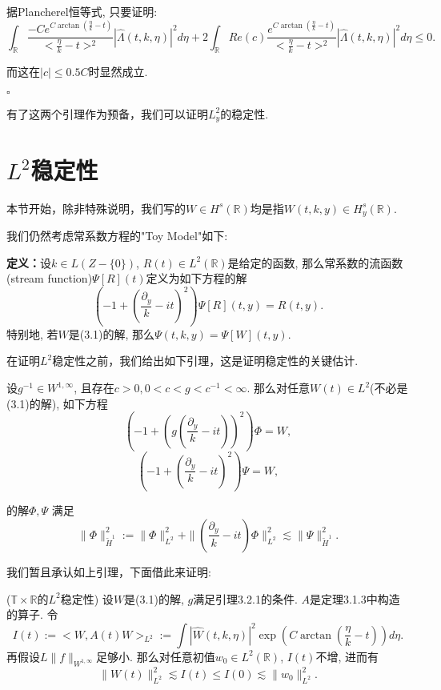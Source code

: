 据Plancherel恒等式, 只要证明:
\begin{equation}
\int_{\mathbb{R}}\frac{-Ce^{C\arctan(\frac{\eta}{k}-t)}}{<\frac{\eta}{k}-t>^2}|\hat{\Lambda}(t,k,\eta)|^2d\eta+2\int_{\mathbb{R}}Re(c)\frac{e^{C\arctan(\frac{\eta}{k}-t)}}{<\frac{\eta}{k}-t>^2}|\hat{\Lambda}(t,k,\eta)|^2d\eta\leq 0.
\end{equation}

而这在$|c|\leq 0.5C$时显然成立.
\begin{flushright}
$\square$
\end{flushright}

有了这两个引理作为预备，我们可以证明$L_y^2$的稳定性.

\section{$L^2$稳定性}

本节开始，除非特殊说明，我们写的$W\in H^s(\mathbb{R})$均是指$W(t,k,y)\in H_y^s(\mathbb{R})$. 

我们仍然考虑常系数方程的"Toy Model"如下:

\textbf{定义：}设$k\in L(Z-\{0\})$, $R(t)\in L^2(\mathbb{R})$是给定的函数, 那么常系数的流函数(stream function)$\Psi[R](t)$定义为如下方程的解
\begin{equation}
(-1+(\frac{\partial_y}{k}-it)^2)\Psi[R](t,y)=R(t,y).
\end{equation}
特别地, 若$W$是(3.1)的解, 那么$\Psi(t,k,y)=\Psi[W](t,y)$.

在证明$L^2$稳定性之前，我们给出如下引理，这是证明稳定性的关键估计.


\begin{lem} 
\songti\rm 设$g^{-1}\in W^{1,\infty}$, 且存在$c>0,0<c<g<c^{-1}<\infty$. 那么对任意$W(t)\in L^2$(不必是(3.1)的解), 如下方程
\begin{equation}
(-1+(g(\frac{\partial_y}{k}-it))^2)\Phi=W,
\end{equation}
\begin{equation}
(-1+(\frac{\partial_y}{k}-it)^2)\Psi=W,
\end{equation}
\end{lem}
的解$\Phi, \Psi$ 满足
\begin{equation}
\|\Phi\|_{\tilde{H}^1}^2:=\|\Phi\|_{L^2}^2+\|(\frac{\partial_y}{k}-it)\Phi\|_{L^2}^2\lesssim \|\Psi\|_{\tilde{H}^1}^2.
\end{equation}

我们暂且承认如上引理，下面借此来证明:

\begin{thm}
\songti\rm ($\mathbb{T}\times\mathbb{R}$的$L^2$稳定性) 设$W$是(3.1)的解, $g$满足引理3.2.1的条件. $A$是定理3.1.3中构造的算子. 令
\begin{equation}
I(t):=<W,A(t)W>_{L^2}:=\int |\hat{W}(t,k,\eta)|^2\exp(C\arctan(\frac{\eta}{k}-t))d\eta.
\end{equation}
再假设$L\|f\|_{W^{1,\infty}}$足够小. 那么对任意初值$w_0\in L^2(\mathbb{R})$, $I(t)$不增, 进而有
\begin{equation}
\|W(t)\|_{L^2}^2\lesssim I(t)\leq I(0)\lesssim\|w_0\|_{L^2}^2.
\end{equation}
\end{thm}

